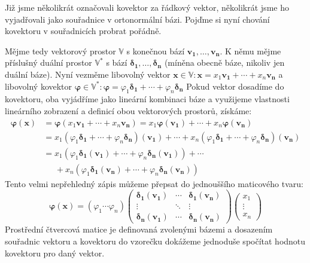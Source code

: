 \documentclass[a5paper,12pt]{amsbook}
\theoremstyle{definition}
\newcommand{\myvec}[1]{\mathbf{#1}}
\newcommand{\myspace}[1]{\mathbb{#1}}
\newcommand{\mydual}[1]{\myspace{#1^{*}}}
\begin{document}
\noindent
Již jsme několikrát označovali kovektor za řádkový vektor, několikrát jsme ho vyjadřovali jako
souřadnice v ortonormální bázi. Pojďme si nyní chování kovektoru v souřadnicích probrat pořádně.

Mějme tedy vektorový prostor $\myspace{V}$ s konečnou bází ${\myvec{v_1}, \hdots , \myvec{v_n}}$.
K němu mějme příslušný duální prostor $\mydual{V}$ s bází
${\myvec{\delta_1}, \hdots , \myvec{\delta_n}}$ (míněna obecně báze, nikoliv jen duální báze).
Nyní vezměme libovolný vektor
$\myvec{x}\in\myspace{V}: \myvec{x} = x_1\myvec{v_1} + \cdots + x_n\myvec{v_n}$
a libovolný kovektor
$\myvec{\varphi}\in\mydual{V}: \myvec{\varphi} = \varphi_1\myvec{\delta_1} + \cdots + \varphi_n\myvec{\delta_n}$
Pokud vektor dosadíme do kovektoru, oba vyjádříme jako lineární kombinaci báze a využijeme
vlastnosti lineárního zobrazení a definicí obou vektorových prostorů, získáme:
\begin{equation*}
\begin{split}
\myvec{\varphi}(\myvec{x}) &= \myvec{\varphi}(x_1\myvec{v_1} + \cdots + x_n\myvec{v_n})
     = x_1\myvec{\varphi}(\myvec{v_1}) + \cdots + x_n\myvec{\varphi}(\myvec{v_n}) \\
    &= x_1(\varphi_1\myvec{\delta_1} + \cdots + \varphi_n\myvec{\delta_n})(\myvec{v_1}) + \cdots
       + x_n(\varphi_1\myvec{\delta_1} + \cdots + \varphi_n\myvec{\delta_n})(\myvec{v_n}) \\
    &= x_1(\varphi_1\myvec{\delta_1}(\myvec{v_1}) + \cdots + \varphi_n\myvec{\delta_n}(\myvec{v_1})) 
    + \cdots \\
    & \;\;\;\;\; + x_n(\varphi_1\myvec{\delta_1}(\myvec{v_n}) + \cdots + \varphi_n\myvec{\delta_n}(\myvec{v_n}))
\end{split}
\end{equation*}
Tento velmi nepřehledný zápis můžeme přepsat do jednouššího maticového tvaru:
\begin{equation*}
\myvec{\varphi}(\myvec{x}) = \left(\varphi_1 \cdots \varphi_n\right)
\left(\begin{array}{ccc}
\myvec{\delta_1}(\myvec{v_1}) & \cdots & \myvec{\delta_1}(\myvec{v_n}) \\
\vdots & \ddots & \vdots \\
\myvec{\delta_n}(\myvec{v_1}) & \cdots & \myvec{\delta_n}(\myvec{v_n})
\end{array}\right)\left(\begin{array}{c}x_1 \\ \vdots \\ x_n\end{array}\right)
\end{equation*}
Prostřední čtvercová matice je definovaná zvolenými bázemi a dosazením souřadnic
vektoru a kovektoru do vzorečku dokážeme jednoduše spočítat hodnotu kovektoru
pro daný vektor.
\end{document}
